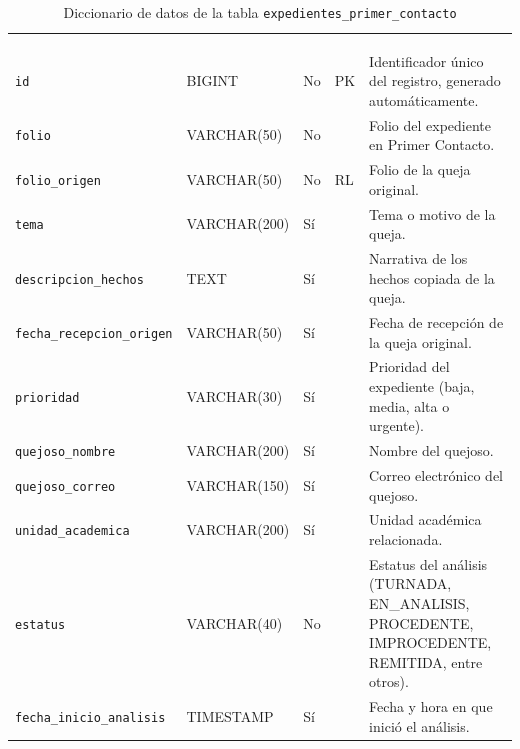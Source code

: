 \footnotesize
\renewcommand{\arraystretch}{1.15}
\setlength{\tabcolsep}{4pt}
\begin{longtable}{|L{3.9cm}|L{2.4cm}|L{0.9cm}|L{1.2cm}|L{6.6cm}|}
	\hiderowcolors\caption{Diccionario de datos de la tabla \texttt{expedientes\_primer\_contacto}}
	\label{tab:dic_expedientes_primer_contacto} \\ \showrowcolors
	\hline
	 &  &  &  &  \\
	\hline
	\endfirsthead
	\hline
	 &  &  &  &  \\
	\hline
	\endhead
		\texttt{id} & BIGINT & No & PK & Identificador único del registro, generado automáticamente. \\ \hline
		\texttt{folio} & VARCHAR(50) & No &  & Folio del expediente en Primer Contacto. \\ \hline
		\texttt{folio\_\allowbreak{}origen} & VARCHAR(50) & No & RL & Folio de la queja original. \\ \hline
		\texttt{tema} & VARCHAR(200) & Sí &  & Tema o motivo de la queja. \\ \hline
		\texttt{descripcion\_\allowbreak{}hechos} & TEXT & Sí &  & Narrativa de los hechos copiada de la queja. \\ \hline
		\texttt{fecha\_\allowbreak{}recepcion\_\allowbreak{}origen} & VARCHAR(50) & Sí &  & Fecha de recepción de la queja original. \\ \hline
		\texttt{prioridad} & VARCHAR(30) & Sí &  & Prioridad del expediente (baja, media, alta o urgente). \\ \hline
		\texttt{quejoso\_\allowbreak{}nombre} & VARCHAR(200) & Sí &  & Nombre del quejoso. \\ \hline
		\texttt{quejoso\_\allowbreak{}correo} & VARCHAR(150) & Sí &  & Correo electrónico del quejoso. \\ \hline
		\texttt{unidad\_\allowbreak{}academica} & VARCHAR(200) & Sí &  & Unidad académica relacionada. \\ \hline
		\texttt{estatus} & VARCHAR(40) & No &  & Estatus del análisis (TURNADA, EN\_ANALISIS, PROCEDENTE, IMPROCEDENTE, REMITIDA, entre otros). \\ \hline
		\texttt{fecha\_\allowbreak{}inicio\_\allowbreak{}analisis} & TIMESTAMP & Sí &  & Fecha y hora en que inició el análisis. \\ \hline

\end{longtable}
